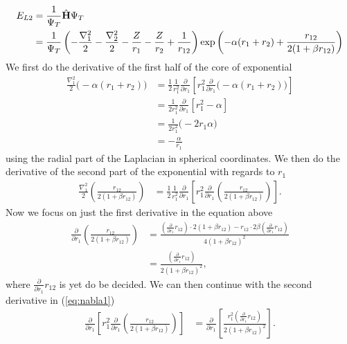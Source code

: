% 

\begin{align*}
    E_{L2} &= \frac{1}{\Psi_T} \hat {\mathbf{H}} \Psi_T \notag\\
    &= \frac{1}{\Psi_T} \left( -\frac{\nabla_1^2}{2} - \frac{\nabla_2^2}{2} - \frac{Z}{r_1} - \frac{Z}{r_2} + \frac{1}{r_{12}} \right) \exp \left( -\alpha (r_1 + r_2) + \frac{r_{12}}{2(1+\beta r_{12})} \right)
\end{align*}
We first do the derivative of the first half of the core of exponential
\begin{align*}
    \frac{\nabla_1^2}{2} \Big( -\alpha(r_1 + r_2) \Big)
    &= \frac{1}{2}\frac{1}{r_1^2} \frac{\partial}{\partial r_1} \left[ r_1^2\frac{\partial}{\partial r_1} \Big( -\alpha(r_1 + r_2) \Big) \right] \\
    &= \frac{1}{2r_1^2} \frac{\partial}{\partial r_1} \left[ r_1^2-\alpha \right] \\
    &= \frac{1}{2r_1^2} \Big( -2r_1\alpha \Big) \\
    &= -\frac{\alpha}{r_1}
\end{align*}
using the radial part of the Laplacian in spherical coordinates. We then do the derivative of the second part of the exponential with regards to $r_1$
\begin{align}
    \frac{\nabla_1^2}{2} \left( \frac{r_{12}}{2(1+\beta r_{12})} \right)
    &= \frac{1}{2}\frac{1}{r_1^2} \frac{\partial}{\partial r_1} \left[ r_1^2\frac{\partial}{\partial r_1} \left( \frac{r_{12}}{2(1+\beta r_{12})} \right) \right].
    \label{eq:nabla1}
\end{align}
Now we focus on just the first derivative in the equation above
\begin{align*}
    \frac{\partial}{\partial r_1} \left( \frac{r_{12}}{2(1+\beta r_{12})} \right)
    &= \frac{ \left(\frac{\partial}{\partial r_1}r_{12}\right) \cdot 2(1 + \beta r_{12}) - r_{12}\cdot 2\beta\left(\frac{\partial}{\partial r_1}r_{12}\right)} {4(1 + \beta r_{12})^2} \\
    &= \frac{\left(\frac{\partial}{\partial r_1}r_{12}\right)}{2(1+\beta r_{12})^2},
\end{align*}
where $\frac{\partial}{\partial r_1}r_{12}$ is yet do be decided. We can then continue with the second derivative in (\ref{eq:nabla1})
\begin{align}
    \frac{\partial}{\partial r_1} \left[ r_1^2\frac{\partial}{\partial r_1} \left( \frac{r_{12}}{2(1+\beta r_{12})} \right) \right] 
    &= \frac{\partial}{\partial r_1} \left[ \frac{r_1^2 \left(\frac{\partial}{\partial r_1}r_{12}\right)}{2(1+\beta r_{12})^2} \right].
    \label{eq:ddr1}
\end{align}
